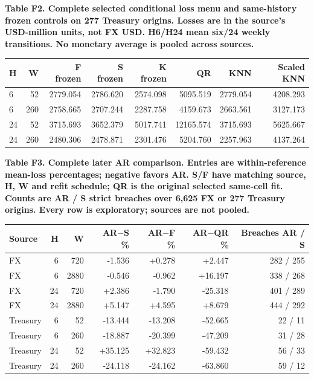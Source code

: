 \documentclass[10pt,a4paper]{article}
\begin{document}
\begin{center}
\begin{minipage}{\linewidth}
\small\textbf{Table F2. Complete selected conditional loss menu and same-history frozen controls on 277 Treasury origins. Losses are in the source's USD-million units, not FX USD. H6/H24 mean six/24 weekly transitions. No monetary average is pooled across sources.}\par\medskip
\centering\fontsize{8}{10}\selectfont
\begin{tabular}{lrrrrrrr}
\toprule
H & W & F frozen & S frozen & K frozen & QR & KNN & Scaled KNN \\
\midrule
6 & 52 & 2779.054 & 2786.620 & 2574.098 & 5095.519 & 2779.054 & 4208.293 \\
6 & 260 & 2758.665 & 2707.244 & 2287.758 & 4159.673 & 2663.561 & 3127.173 \\
24 & 52 & 3715.693 & 3652.379 & 5017.741 & 12165.574 & 3715.693 & 5625.667 \\
24 & 260 & 2480.306 & 2478.871 & 2301.476 & 5204.760 & 2257.963 & 4137.264 \\
\bottomrule
\end{tabular}
\end{minipage}
\end{center}
\begin{center}
\begin{minipage}{\linewidth}
\small\textbf{Table F3. Complete later AR comparison. Entries are within-reference mean-loss percentages; negative favors AR. S/F have matching source, H, W and refit schedule; QR is the original selected same-cell fit. Counts are AR / S strict breaches over 6,625 FX or 277 Treasury origins. Every row is exploratory; sources are not pooled.}\par\medskip
\centering\fontsize{8}{10}\selectfont
\begin{tabular}{lrrrrrr}
\toprule
Source & H & W & AR\(-\)S \% & AR\(-\)F \% & AR\(-\)QR \% & Breaches AR / S \\
\midrule
FX & 6 & 720 & -1.536 & +0.278 & +2.447 & 282 / 255 \\
FX & 6 & 2880 & -0.546 & -0.962 & +16.197 & 338 / 268 \\
FX & 24 & 720 & +2.386 & -1.790 & -25.318 & 401 / 289 \\
FX & 24 & 2880 & +5.147 & +4.595 & +8.679 & 444 / 292 \\
Treasury & 6 & 52 & -13.444 & -13.208 & -52.665 & 22 / 11 \\
Treasury & 6 & 260 & -18.887 & -20.399 & -47.209 & 31 / 28 \\
Treasury & 24 & 52 & +35.125 & +32.823 & -59.432 & 56 / 33 \\
Treasury & 24 & 260 & -24.118 & -24.162 & -63.860 & 59 / 12 \\
\bottomrule
\end{tabular}
\end{minipage}
\end{center}
\end{document}
